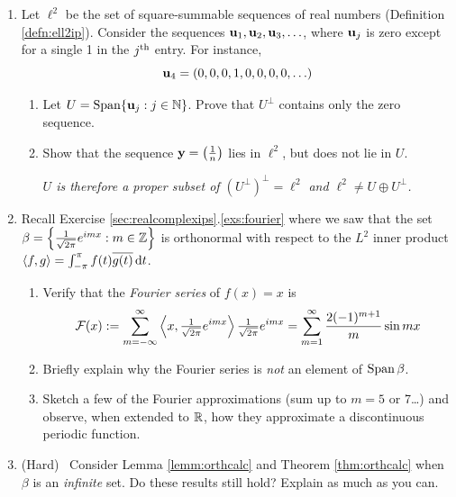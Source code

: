 \begin{exercises}{}{}
\begin{enumerate}
	  
	  \item\label{ex:ell2ex} Let $\ell^2$ be the set of square-summable sequences of real numbers (Definition \ref{defn:ell2ip}). Consider the sequences ${\mathbf{u}}_1,{\mathbf{u}}_2,{\mathbf{u}}_3,\ldots$, where ${\mathbf{u}}_j$ is zero except for a single 1 in the $j\textsuperscript{th}$ entry. For instance,
	 	\[
	 		{\mathbf{u}}_4=(0,0,0,1,0,0,0,0,\ldots)
	 	\]
	  \begin{enumerate}
	    \item Let $U=\operatorname{Span}\{{\mathbf{u}}_j:j\in\mathbb{N}\}$. Prove that $U^\perp$ contains only the zero sequence.
	    
	    \item Show that the sequence ${\mathbf{y}}=\left(\frac 1n\right)$ lies in $\ell^2$, but does not lie in $U$.\par
	    \emph{$U$ is therefore a \emph{proper subset} of $(U^\perp)^\perp=\ell^2$ and $\ell^2\neq U\oplus U^\perp$.}
	  \end{enumerate}
	  
	 
	  \item\label{ex:fourierx} Recall Exercise \ref*{sec:realcomplexips}.\ref{exs:fourier} where we saw that the set $\beta=\left\{\frac 1{\sqrt{2\pi}}e^{i mx}:m\in\mathbb{Z}\right\}$ is orthonormal with respect to the $L^2$ inner product $\left\langle f,g\right\rangle=\int_{-\pi}^\pi f(t)\overline{g(t)}\,{\mathrm{d} t}$.
	  \begin{enumerate}
	    \item Verify that the \emph{Fourier series} of $f(x)=x$ is
	  	\[
	  		\mathcal{F}(x):=\sum_{m=-\infty}^\infty \ip{x,\tfrac 1{\sqrt{2\pi}}e^{i mx}}\tfrac 1{\sqrt{2\pi}}e^{i mx} %
	  		=\sum_{m=1}^\infty\frac{2(-1)^{m+1}}m\sin mx
	  	\]
	  	
	  	\item Briefly explain why the Fourier series is \emph{not} an element of $\operatorname{Span}\beta$.
	  	
	  	\item Sketch a few of the Fourier approximations (sum up to $m=5$ or 7\ldots) and observe, when extended to $\mathbb{R}$, how they approximate a discontinuous periodic function.
	 	\end{enumerate}
	
	  
	  \item (Hard) \ Consider Lemma \ref{lemm:orthcalc} and Theorem \ref{thm:orthcalc} when $\beta$ is an \emph{infinite} set. Do these results still hold? Explain as much as you can.
	
	  
		

\end{enumerate}
\end{exercises}
